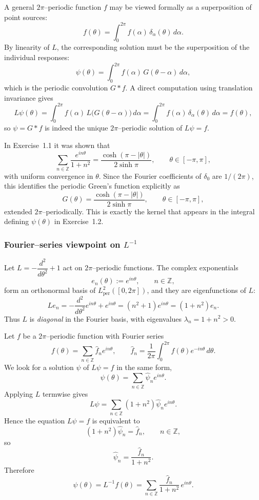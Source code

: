\documentclass[12pt,a4paper]{article}
\theoremstyle{plain}
\theoremstyle{definition}
\theoremstyle{remark}
\theoremstyle{remark}
\begin{document}
\medskip

A general $2\pi$--periodic function $f$ may be viewed formally as a
superposition of point sources:
\[
f(\theta)
= \int_0^{2\pi} f(\alpha)\,\delta_\alpha(\theta)\,d\alpha.
\]
By linearity of $L$, the corresponding solution must be the superposition
of the individual responses:
\[
\psi(\theta)
= \int_0^{2\pi} f(\alpha)\,G(\theta-\alpha)\,d\alpha,
\]
which is the periodic convolution $G * f$.  A direct computation using
translation invariance gives
\[
L\psi(\theta)
= \int_0^{2\pi} f(\alpha)\,L\big(G(\theta-\alpha)\big)\,d\alpha
= \int_0^{2\pi} f(\alpha)\,\delta_\alpha(\theta)\,d\alpha
= f(\theta),
\]
so $\psi=G*f$ is indeed the unique $2\pi$--periodic solution of
$L\psi=f$.

\medskip

In Exercise~1.1 it was shown that
\[
\sum_{n\in\mathbb{Z}} \frac{e^{in\theta}}{1+n^2}
= \frac{\cosh(\pi-|\theta|)}{2\sinh\pi},
\qquad \theta\in[-\pi,\pi],
\]
with uniform convergence in $\theta$.  Since the Fourier coefficients of
$\delta_0$ are $1/(2\pi)$, this identifies the periodic Green's function
explicitly as
\[
G(\theta) = \frac{\cosh(\pi-|\theta|)}{2\sinh\pi},
\qquad \theta\in[-\pi,\pi],
\]
extended $2\pi$--periodically.  This is exactly the kernel that appears in
the integral defining $\psi(\theta)$ in Exercise~1.2.

\subsubsection*{Fourier–series viewpoint on $L^{-1}$}

Let $L = -\dfrac{d^2}{d\theta^2} + 1$ act on $2\pi$--periodic functions.
The complex exponentials
\[
e_n(\theta) := e^{in\theta}, \qquad n\in\mathbb{Z},
\]
form an orthonormal basis of $L^2_{\mathrm{per}}([0,2\pi])$, and they are
eigenfunctions of $L$:
\[
L e_n
= -\frac{d^2}{d\theta^2}e^{in\theta} + e^{in\theta}
= (n^2 + 1)e^{in\theta}
= (1+n^2)e_n.
\]
Thus $L$ is \emph{diagonal} in the Fourier basis, with eigenvalues
$\lambda_n = 1+n^2>0$.

Let $f$ be a $2\pi$--periodic function with Fourier series
\[
f(\theta) = \sum_{n\in\mathbb{Z}} \hat f_n e^{in\theta},
\qquad
\hat f_n = \frac{1}{2\pi}\int_0^{2\pi} f(\theta)e^{-in\theta}\,d\theta.
\]
We look for a solution $\psi$ of $L\psi=f$ in the same form,
\[
\psi(\theta) = \sum_{n\in\mathbb{Z}} \hat \psi_n e^{in\theta}.
\]
Applying $L$ termwise gives
\[
L\psi
= \sum_{n\in\mathbb{Z}} (1+n^2)\hat \psi_n e^{in\theta}.
\]
Hence the equation $L\psi=f$ is equivalent to
\[
(1+n^2)\hat \psi_n = \hat f_n,
\qquad n\in\mathbb{Z},
\]
so
\[
\hat \psi_n = \frac{\hat f_n}{1+n^2}.
\]
Therefore
\[
\psi(\theta)
= L^{-1}f(\theta)
= \sum_{n\in\mathbb{Z}} \frac{\hat f_n}{1+n^2}\,e^{in\theta}.
\]
\end{document}
